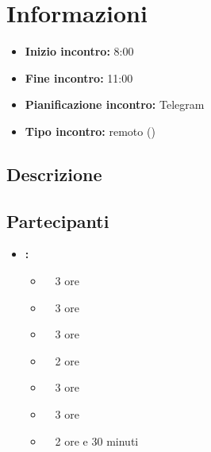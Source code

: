 \section{Informazioni}
\begin{itemize}
	\item \textbf{Inizio incontro:} 8:00
	\item \textbf{Fine incontro:} 11:00
	\item \textbf{Pianificazione incontro:} Telegram
	\item \textbf{Tipo incontro:} remoto ()
\end{itemize}

\subsection{Descrizione}
\DocDescription

\subsection{Partecipanti}

\begin{itemize}
	\item \textbf{\GroupName:}
	\begin{itemize}
		\item \tommaso \ \rightarrow\ 3 ore
		\item \marco \ \rightarrow\ 3 ore
		\item \raul \ \rightarrow\ 3 ore
		\item \sebastiano \ \rightarrow\ 2 ore
		\item \martina \ \rightarrow\ 3 ore
		\item \riccardo \ \rightarrow\ 3 ore
		\item \mattia \ \rightarrow\ 2 ore e 30 minuti
	\end{itemize}
\end{itemize}

\clearpage
